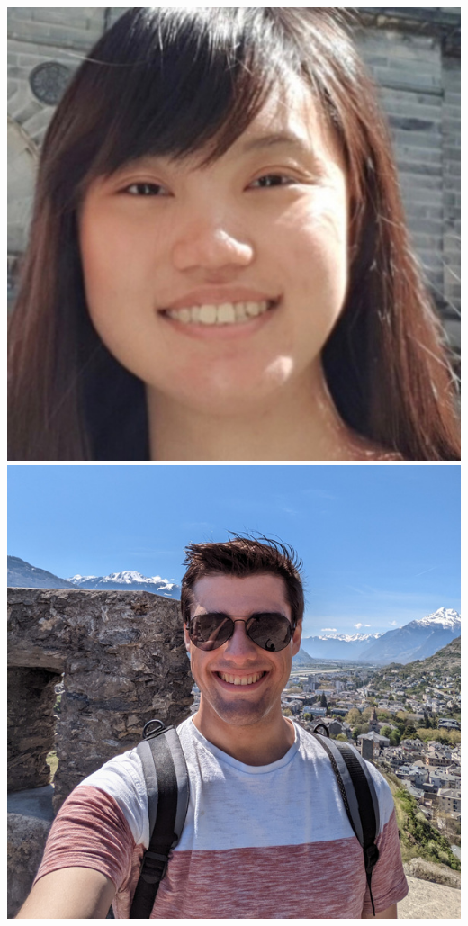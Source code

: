 \documentclass[aspectratio=169]{beamer}
\begin{document}
\begin{frame}
{        \includegraphics[width=0.09\textheight]{figures/students/dily_ong.jpg}%
        \includegraphics[width=0.09\textheight]{figures/students/george_carter.jpg}%
}
\end{frame}
\end{document}
